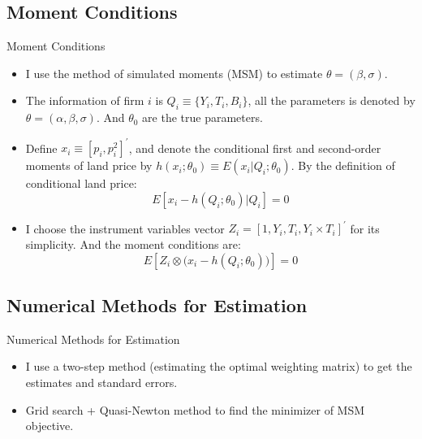 \documentclass[xcolor={dvipsnames}]{beamer}
\theoremstyle{plain}
\begin{document}
\subsection{Moment Conditions}
\begin{frame}{Moment Conditions}
    \begin{itemize}
        \item I use the method of simulated moments (MSM) to estimate $\theta = (\beta, \sigma)$.
        \item The information of firm $i$ is $Q_i \equiv \{Y_i, T_i, B_i\}$, all the
              parameters is denoted by $\theta = (\alpha, \beta, \sigma)$. And $\theta_0$ are the true parameters.
        \item Define $x_i \equiv [p_i, p_i^2]^{'}$,
              and denote the conditional first and second-order moments of land price
              by $h(x_i; \theta_0) \equiv E(x_i|Q_i;\theta_0)$.
              By the definition of conditional land price:
              \begin{equation*}
                  E[x_i - h(Q_i; \theta_0)|Q_i] = 0
              \end{equation*}
        \item I choose
              the instrument variables vector $Z_i = [1, Y_i, T_i, Y_i \times T_i]^{\prime}$
              for its simplicity.
              And the moment conditions are:
              \begin{equation*}
                  E[Z_i \otimes \big(x_i - h(Q_i; \theta_0)\big)] = 0
              \end{equation*}
    \end{itemize}
\end{frame}

\subsection{Numerical Methods for Estimation}
\begin{frame}{Numerical Methods for Estimation}
    \begin{itemize}
        \item I use a two-step method (estimating the optimal weighting matrix)
              to get the estimates and standard errors.
        \item Grid search + Quasi-Newton method to find the minimizer of MSM objective.
    \end{itemize}
\end{frame}
\end{document}
